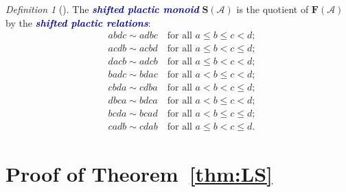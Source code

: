 \documentclass[12 pt]{amsart}
\newcommand{\newword}[1]{\textcolor{darkblue}{\textbf{\emph{#1}}}}
\newcommand{\Free}{\mathbf{F}}
\newcommand{\sPlactic}{\mathbf{S}}
\newcommand{\cA}{\mathcal{A}}
\theoremstyle{remark}
\newtheorem{definition}[thm]{Definition}
\numberwithin{equation}{section}
\begin{document}
\begin{definition}[\cite{Serrano}]\label{def:shifted_plactic}
    The \newword{shifted plactic monoid} $\sPlactic(\cA)$ is the quotient of $\Free(\cA)$ by the \newword{shifted plactic relations}:
    \begin{align}
        &abdc\sim adbc \quad \text{for all }  a\leq b \leq c<d; \tag{SP.1}\label{eq:SP1} \\
    &acdb\sim acbd \quad \text{for all }  a\leq b < c \leq d; \tag{SP.2}\label{eq:SP2} \\ 
        &dacb\sim adcb \quad \text{for all }  a\leq b < c <d;\tag{SP.3}\label{eq:SP3} \\ 
        &badc\sim bdac \quad \text{for all }  a< b \leq c<d; \tag{SP.4}\label{eq:SP4} \\ 
        &cbda\sim cdba \quad \text{for all }  a< b <c \leq d; \tag{SP.5}\label{eq:SP5} \\ 
        &dbca\sim bdca \quad \text{for all }  a< b \leq c<d; \tag{SP.6}\label{eq:SP6} \\ 
        &bcda\sim bcad \quad \text{for all }  a< b \leq c\leq d; \label{eq:SP7} \tag{SP.7} \\ 
        &cadb\sim cdab \quad \text{for all }  a\leq  b < c\leq d. \tag{SP.8} \label{eq:SP8}
    \end{align}
\end{definition}

\section{Proof of Theorem~\ref{thm:LS}}\label{sec:LS_universal_proof}

\end{document}
